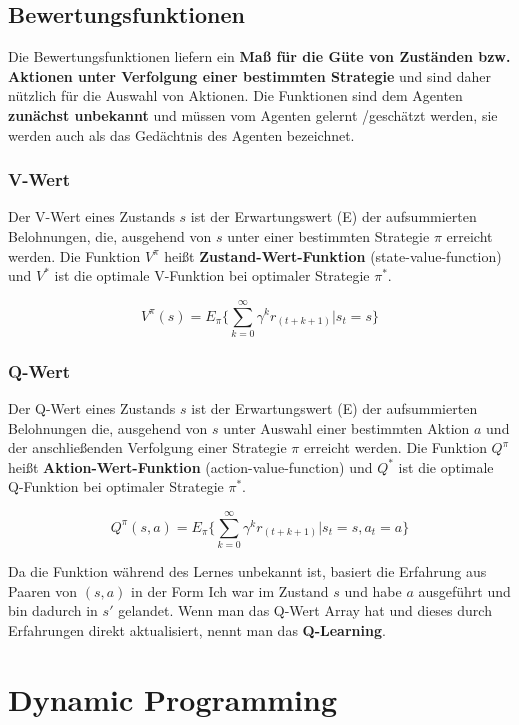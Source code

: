 \documentclass[10pt]{scrartcl}
\begin{document}
\subsection{Bewertungsfunktionen}
Die Bewertungsfunktionen liefern ein \textbf{Maß für die Güte von Zuständen bzw. Aktionen unter Verfolgung einer bestimmten Strategie} und sind daher nützlich für die Auswahl von Aktionen. Die Funktionen sind dem Agenten \textbf{zunächst unbekannt} und müssen vom Agenten gelernt /geschätzt werden, sie werden auch als das Gedächtnis des Agenten bezeichnet.

\subsubsection{V-Wert}
Der V-Wert eines Zustands $s$ ist der Erwartungswert (E) der aufsummierten Belohnungen, die, ausgehend von $s$ unter einer bestimmten Strategie $\pi$ erreicht werden. Die Funktion $V^{\pi}$ heißt \textbf{Zustand-Wert-Funktion} (state-value-function) und $V^{*}$ ist die optimale V-Funktion bei optimaler Strategie $\pi^{*}$.

\begin{equation}
V^{\pi}(s)= E_{\pi} \{ \sum_{k=0}^\infty \gamma^k r_{(t+k+1)} | s_{t}=s \}
\end{equation}

\subsubsection{Q-Wert}
Der Q-Wert eines Zustands $s$ ist der Erwartungswert (E) der aufsummierten Belohnungen die, ausgehend von $s$ unter Auswahl einer bestimmten Aktion $a$ und der anschließenden Verfolgung einer Strategie $\pi$ erreicht werden. Die Funktion $Q^{\pi}$ heißt \textbf{Aktion-Wert-Funktion} (action-value-function) und $Q^{*}$ ist die optimale Q-Funktion bei optimaler Strategie $\pi^{*}$.

\begin{equation}
Q^{\pi}(s,a)= E_{\pi} \{ \sum_{k=0}^\infty \gamma^k r_{(t+k+1)} | s_{t}=s, a_{t}=a \}
\end{equation}

Da die Funktion während des Lernes unbekannt ist, basiert die Erfahrung aus Paaren von $(s,a)$ in der Form \glqq Ich war im Zustand $s$ und habe $a$ ausgeführt und bin dadurch in $s'$ gelandet\grqq\xspace. Wenn man das Q-Wert Array hat und dieses durch Erfahrungen direkt aktualisiert, nennt man das \textbf{Q-Learning}.

\section{Dynamic Programming}
\label{sec:dynamicPrograming}
\end{document}
